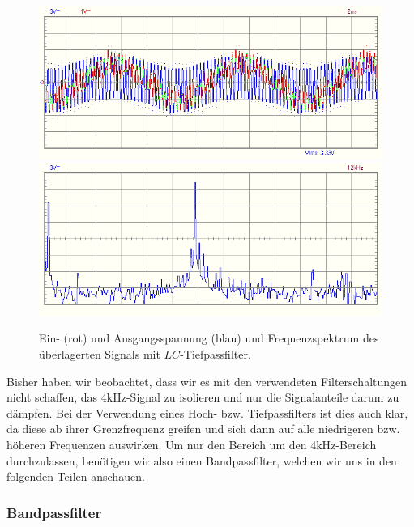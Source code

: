 \begin{figure}[H]
  \centering
  \includegraphics[width=.9\textwidth]{files/aufgabe8_teil2_lc_tiefpass_oszi.png}
  \includegraphics[width=.9\textwidth]{files/aufgabe8_teil2_lc_tiefpass_spectrum.png}
  \caption{Ein- (rot) und Ausgangsspannung (blau) und Frequenzspektrum des überlagerten Signals mit $LC$-Tiefpassfilter.}
  \label{fig:aufgabe8_teil2_lc_tiefpass}
\end{figure}

Bisher haben wir beobachtet, dass wir es mit den verwendeten Filterschaltungen nicht schaffen, das  $4\si{\kilo\hertz}$-Signal zu isolieren und nur die Signalanteile darum zu dämpfen. Bei der Verwendung eines Hoch- bzw. Tiefpassfilters ist dies auch klar, da diese ab ihrer Grenzfrequenz greifen und sich dann auf alle niedrigeren bzw. höheren Frequenzen auswirken. Um nur den Bereich um den $4\si{\kilo\hertz}$-Bereich durchzulassen, benötigen wir also einen Bandpassfilter, welchen wir uns in den folgenden Teilen anschauen.
\newpage
\subsubsection*{Bandpassfilter}


